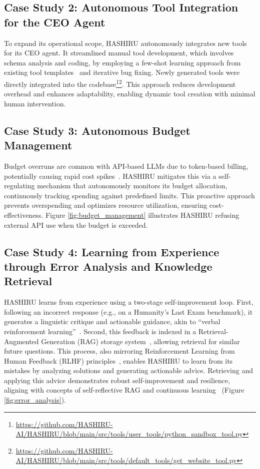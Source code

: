 \documentclass[conference]{IEEEtran}
\begin{document}
\subsection{Case Study 2: Autonomous Tool Integration for the CEO Agent}
\label{sec:casestudy2_tools}
To expand its operational scope, HASHIRU autonomously integrates new tools for its CEO agent. It streamlined manual tool development, which involves schema analysis and coding, by employing a few-shot learning approach from existing tool templates~\cite{brown2020language} and iterative bug fixing. Newly generated tools were directly integrated into the codebase\footnote{\url{https://github.com/HASHIRU-AI/HASHIRU/blob/main/src/tools/user_tools/python_sandbox_tool.py}}\footnote{\url{https://github.com/HASHIRU-AI/HASHIRU/blob/main/src/tools/default_tools/get_website_tool.py}}. This approach reduces development overhead and enhances adaptability, enabling dynamic tool creation with minimal human intervention.

\subsection{Case Study 3: Autonomous Budget Management}
\label{sec:casestudy3_budget}
Budget overruns are common with API-based LLMs due to token-based billing, potentially causing rapid cost spikes~\cite{gemini_reddit,openai_sos,openai_costs}. HASHIRU mitigates this via a self-regulating mechanism that autonomously monitors its budget allocation, continuously tracking spending against predefined limits. This proactive approach prevents overspending and optimizes resource utilization, ensuring cost-effectiveness. Figure \ref{fig:budget_management} illustrates HASHIRU refusing external API use when the budget is exceeded.

\subsection{Case Study 4: Learning from Experience through Error Analysis and Knowledge Retrieval}
\label{sec:casestudy4_experiential_learning}
HASHIRU learns from experience using a two-stage self-improvement loop. First, following an incorrect response (e.g., on a Humanity's Last Exam benchmark), it generates a linguistic critique and actionable guidance, akin to ``verbal reinforcement learning''~\cite{shinn2023reflexion}. Second, this feedback is indexed in a Retrieval-Augmented Generation (RAG) storage system~\cite{lewis2021retrievalaugmentedgenerationknowledgeintensivenlp}, allowing retrieval for similar future questions. This process, also mirroring Reinforcement Learning from Human Feedback (RLHF) principles~\cite{ziegler2019fine,ouyang2022training}, enables HASHIRU to learn from its mistakes by analyzing solutions and generating actionable advice. Retrieving and applying this advice demonstrates robust self-improvement and resilience, aligning with concepts of self-reflective RAG and continuous learning~\cite{asai2023self,shinn2023reflexion} (Figure \ref{fig:error_analysis}).
\end{document}
